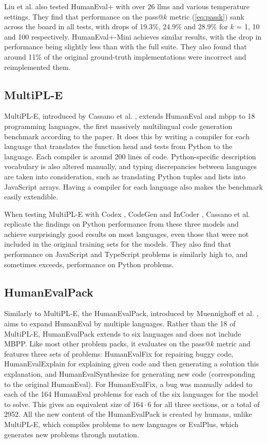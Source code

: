 Liu et al. also tested HumanEval+ with over 26 \acp{llm} and various temperature settings.
They find that performance on the pass@$k$ metric (\ref{eq:passk}) sank across the board in all tests, with drops of 19.3\%, 24.9\% and 28.9\% for $k$ = 1, 10 and 100 respectively.
HumanEval+-Mini achieves similar results, with the drop in performance being slightly less than with the full suite.
They also found that around 11\% of the original ground-truth implementations were incorrect and reimplemented them.

\subsection{MultiPL-E}
\label{sec:multiple}
MultiPL-E, introduced by Cassano et al. \cite{Cassano.2023}, extends HumanEval and \ac{mbpp} to 18 programming languages, the first massively multilingual code generation benchmark according to the paper.
It does this by writing a compiler for each language that translates the function head and tests from Python to the language.
Each compiler is around 200 lines of code.
Python-specific description vocabulary is also altered manually, and typing discrepancies between languages are taken into consideration, such as translating Python tuples and lists into JavaScript arrays.
Having a compiler for each language also makes the benchmark easily extendible.

When testing MultiPL-E with Codex \cite{Chen.2021}, CodeGen \cite{Nijkamp.2022} and InCoder \cite{Fried.2023}, Cassano et al. replicate the findings on Python performance from these three models and achieve surprisingly good results on most languages, even those that were not included in the original training sets for the models.
They also find that performance on JavaScript and TypeScript problems is similarly high to, and sometimes exceeds, performance on Python problems.

\subsection{HumanEvalPack}
\label{sec:octopack}
Similarly to MultiPL-E, the HumanEvalPack, introduced by Muennighoff et al. \cite{Muennighoff.2024}, aims to expand HumanEval by multiple languages.
Rather than the 18 of MultiPL-E, HumanEvalPack extends to six languages and does not include MBPP.
Like most other problem packs, it evaluates on the pass@$k$ metric and features three sets of problems: HumanEvalFix for repairing buggy code, HumanEvalExplain for explaining given code and then generating a solution this explanation, and HumanEvalSynthesize for generating new code (corresponding to the original HumanEval).
For HumanEvalFix, a bug was manually added to each of the 164 HumanEval problems for each of the six languages for the model to solve.
This gives an equivalent size of $164\cdot6$ for all three sections, or a total of 2952.
All the new content of the HumanEvalPack is created by humans, unlike MultiPL-E, which compiles problems to new languages or EvalPlus, which generates new problems through mutation.


